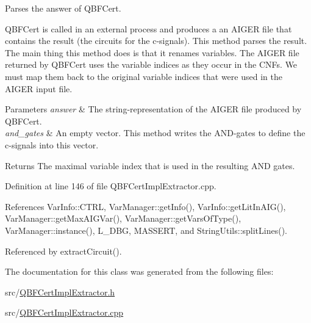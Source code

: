Parses the answer of Q\-B\-F\-Cert. 

Q\-B\-F\-Cert is called in an external process and produces a an A\-I\-G\-E\-R file that contains the result (the circuits for the c-\/signals). This method parses the result. The main thing this method does is that it renames variables. The A\-I\-G\-E\-R file returned by Q\-B\-F\-Cert uses the variable indices as they occur in the C\-N\-Fs. We must map them back to the original variable indices that were used in the A\-I\-G\-E\-R input file.


\begin{DoxyParams}{Parameters}
{\em answer} & The string-\/representation of the A\-I\-G\-E\-R file produced by Q\-B\-F\-Cert. \\
\hline
{\em and\-\_\-gates} & An empty vector. This method writes the A\-N\-D-\/gates to define the c-\/signals into this vector. \\
\hline
\end{DoxyParams}
\begin{DoxyReturn}{Returns}
The maximal variable index that is used in the resulting A\-N\-D gates. 
\end{DoxyReturn}


Definition at line 146 of file Q\-B\-F\-Cert\-Impl\-Extractor.\-cpp.



References Var\-Info\-::\-C\-T\-R\-L, Var\-Manager\-::get\-Info(), Var\-Info\-::get\-Lit\-In\-A\-I\-G(), Var\-Manager\-::get\-Max\-A\-I\-G\-Var(), Var\-Manager\-::get\-Vars\-Of\-Type(), Var\-Manager\-::instance(), L\-\_\-\-D\-B\-G, M\-A\-S\-S\-E\-R\-T, and String\-Utils\-::split\-Lines().



Referenced by extract\-Circuit().



The documentation for this class was generated from the following files\-:\begin{DoxyCompactItemize}
\item 
src/\hyperlink{QBFCertImplExtractor_8h}{Q\-B\-F\-Cert\-Impl\-Extractor.\-h}\item 
src/\hyperlink{QBFCertImplExtractor_8cpp}{Q\-B\-F\-Cert\-Impl\-Extractor.\-cpp}\end{DoxyCompactItemize}
